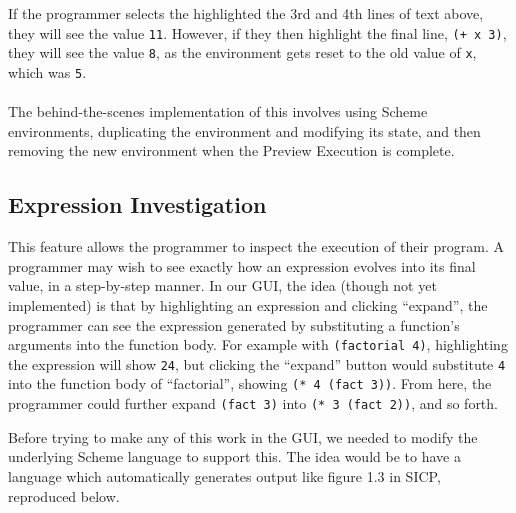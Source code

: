 \documentclass[10pt,journal,compsoc]{IEEEtran}
\begin{document}
        If the programmer selects the highlighted the 3rd and 4th lines of text above, they will see the value \lstinline{11}. However, if they then highlight the final line, \lstinline{(+ x 3)}, they will see the value \lstinline{8}, as the environment gets reset to the old value of \lstinline{x}, which was \lstinline{5}.\\
        \\
        The behind-the-scenes implementation of this involves using Scheme environments, duplicating the environment and modifying its state, and then removing the new environment when the Preview Execution is complete.

        \subsection{Expression Investigation}
        
        This feature allows the programmer to inspect the execution of their program. A programmer may wish to see exactly how an expression evolves into its final value, in a step-by-step manner. In our GUI, the idea (though not yet implemented) is that by highlighting an expression and clicking “expand”, the programmer can see the expression generated by substituting a function’s arguments into the function body. For example with \lstinline{(factorial 4)}, highlighting the expression will show \lstinline{24}, but clicking the “expand” button would substitute \lstinline{4} into the function body of “factorial”, showing \lstinline{(* 4 (fact 3))}. From here, the programmer could further expand \lstinline{(fact 3)} into \lstinline{(* 3 (fact 2))}, and so forth. 

        Before trying to make any of this work in the GUI, we needed to modify the underlying Scheme language to support this. The idea would be to have a language which automatically generates output like figure 1.3 in SICP, reproduced below. 
\end{document}
